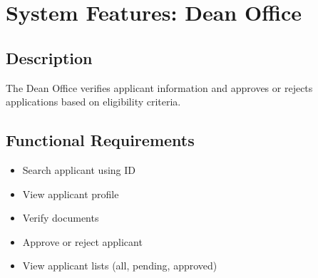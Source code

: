 \section{System Features: Dean Office}

\subsection{Description}
The Dean Office verifies applicant information and approves or rejects applications based on eligibility criteria.

\subsection{Functional Requirements}

\begin{itemize}
    \item Search applicant using ID
    \item View applicant profile
    \item Verify documents
    \item Approve or reject applicant
    \item View applicant lists (all, pending, approved)
\end{itemize}